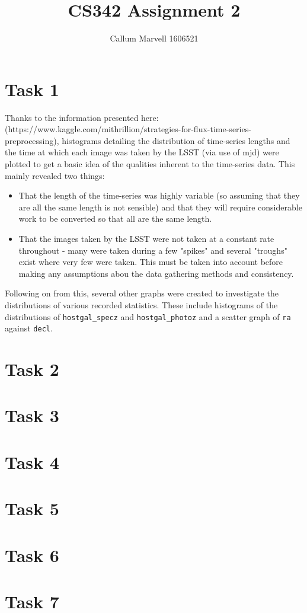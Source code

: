 \documentclass[11pt]{article}
\title{CS342 Assignment 2}
\author{Callum Marvell 1606521}
\begin{document}
\maketitle

\section{Task 1}
Thanks to the information presented here: (https://www.kaggle.com/mithrillion/strategies-for-flux-time-series-preprocessing), histograms detailing the distribution of time-series lengths and the time at which each image was taken by the LSST (via use of mjd) were plotted to get a basic idea of the qualities inherent to the time-series data. This mainly revealed two things:
\begin{itemize}
	\item That the length of the time-series was highly variable (so assuming that they are all the same length is not sensible) and that they will require considerable work to be converted so that all are the same length.
	\item That the images taken by the LSST were not taken at a constant rate throughout - many were taken during a few "spikes" and several "troughs" exist where very few were taken. This must be taken into account before making any assumptions abou the data gathering methods and consistency.
\end{itemize}
Following on from this, several other graphs were created to investigate the distributions of various recorded statistics. These include histograms of the distributions of \lstinline!hostgal_specz! and \lstinline!hostgal_photoz! and a scatter graph of \lstinline!ra! against \lstinline!decl!.
	
\section{Task 2}

\section{Task 3}

\section{Task 4}

\section{Task 5}

\section{Task 6}

\section{Task 7}
\end{document}
